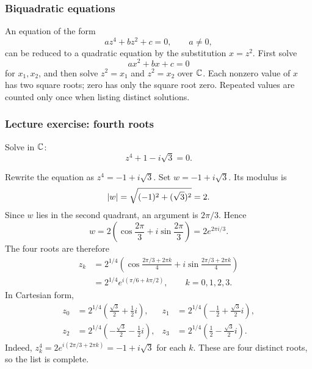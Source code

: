 \documentclass[11pt,a4paper]{amsart}
\begin{document}
\subsubsection{Biquadratic equations}

An equation of the form
\[
  az^4+bz^2+c=0,\qquad a\neq0,
\]
can be reduced to a quadratic equation by the substitution \(x=z^2\).
First solve
\[
  ax^2+bx+c=0
\]
for \(x_1,x_2\), and then solve \(z^2=x_1\) and \(z^2=x_2\)
over \(\mathbb{C}\). Each nonzero value of \(x\) has two square roots;
zero has only the square root zero. Repeated values are counted only
once when listing distinct solutions.

\subsubsection{Lecture exercise: fourth roots}

\begin{problem}
  Solve in \(\mathbb{C}\):
  \[
    z^4+1-i\sqrt3=0.
  \]
\end{problem}

\begin{solution}
  Rewrite the equation as \(z^4=-1+i\sqrt3\). Set
  \(w=-1+i\sqrt3\). Its modulus is
  \[
    \lvert w\rvert=\sqrt{(-1)^2+(\sqrt3)^2}=2.
  \]
  Since \(w\) lies in the second quadrant, an argument is
  \(2\pi/3\). Hence
  \[
    w=2\left(\cos\frac{2\pi}3+i\sin\frac{2\pi}3\right)
    =2e^{2\pi i/3}.
  \]
  The four roots are therefore
  \begin{align*}
    z_k
    &=2^{1/4}\left(
      \cos\frac{2\pi/3+2\pi k}{4}
    +i\sin\frac{2\pi/3+2\pi k}{4}\right)\\
    &=2^{1/4}e^{i(\pi/6+k\pi/2)},\qquad k=0,1,2,3.
  \end{align*}
  In Cartesian form,
  \begin{align*}
    z_0&=2^{1/4}\left(\frac{\sqrt3}{2}+\frac12i\right),&
    z_1&=2^{1/4}\left(-\frac12+\frac{\sqrt3}{2}i\right),\\
    z_2&=2^{1/4}\left(-\frac{\sqrt3}{2}-\frac12i\right),&
    z_3&=2^{1/4}\left(\frac12-\frac{\sqrt3}{2}i\right).
  \end{align*}
  Indeed, \(z_k^4=2e^{i(2\pi/3+2\pi k)}=-1+i\sqrt3\)
  for each \(k\). These are four distinct roots, so the list is complete.
\end{solution}
\end{document}
